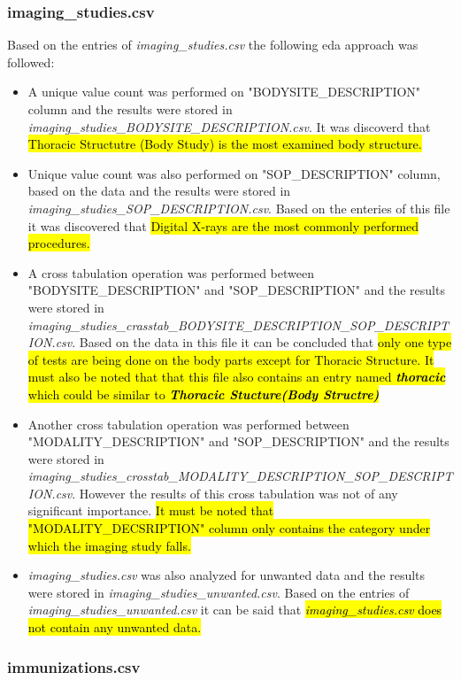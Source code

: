 \documentclass[12pt, twosided]{report}  %
\begin{document}
\subsubsection{imaging\_studies.csv}
Based on the entries of \textit{imaging\_studies.csv} the following eda approach was followed:
\begin{itemize}
	\item  A unique value count was performed on "BODYSITE\_DESCRIPTION" column and the results were stored in \textit{imaging\_studies\_BODYSITE\_DESCRIPTION.csv}. It was discoverd that \hl{Thoracic Structutre (Body Study) is the most examined body structure.}
	\item Unique value count was also performed on "SOP\_DESCRIPTION" column, based on the data and the results were stored in \textit{imaging\_studies\_SOP\_DESCRIPTION.csv}. Based on the enteries of this file it was discovered that \hl{Digital X-rays are the most commonly performed procedures.}
	
	\item A cross tabulation operation was performed between "BODYSITE\_DESCRIPTION" and "SOP\_DESCRIPTION" and the results were stored in \textit{imaging\_studies\_crasstab\_BODYSITE\_DESCRIPTION\_SOP\_DESCRIPTION.csv}. Based on the data in this file it can be concluded that \hl{only one type of tests are being done on the body parts except for Thoracic Structure. It must also be noted that that this file also contains an entry named \textbf{\textit{thoracic}} which could be similar to \textbf{\textit{Thoracic Stucture(Body Structre)}}} 
	
	\item Another cross tabulation operation was performed between "MODALITY\_DESCRIPTION" and "SOP\_DESCRIPTION" and the results were stored in \textit{imaging\_studies\_crosstab\_MODALITY\_DESCRIPTION\_SOP\_DESCRIPTION.csv}. However the results of this cross tabulation was not of any significant importance. \hl{It must be noted that "MODALITY\_DECSRIPTION" column only contains the category under which the imaging study falls.} 
	
	\item \textit{imaging\_studies.csv} was also analyzed for unwanted data and the results were stored in \textit{imaging\_studies\_unwanted.csv}. Based on the entries of \textit{imaging\_studies\_unwanted.csv} it can be said that \hl{\textit{imaging\_studies.csv} does not contain any unwanted data.}
\end{itemize}

\subsubsection{immunizations.csv}
\end{document}
